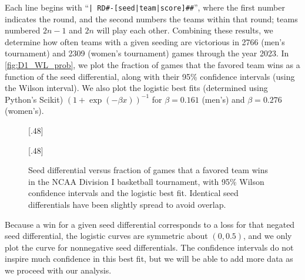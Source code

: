 \documentclass{article}
\begin{document}
Each line begins with ``\texttt{| RD\#-[seed|team|score]\#\#}'', where the first number indicates the round, and the second numbers the teams within that round; teams numbered $2n-1$ and $2n$ will play each other.  Combining these results, we determine how often teams with a given seeding are victorious in 2766 (men's tournament) and 2309 (women's tournament) games through the year 2023. %
%
In \autoref{fig:D1_WL_prob}, we plot the fraction of games that the favored team wins as a function of the seed differential, along with their 95\% confidence intervals (using the Wilson interval\cite{Brown}).  We also plot the logistic best fits (determined using Python's Scikit\cite{scikit-learn}) $(1+\exp(-\beta x))^{-1}$ for $\beta=0.161$ (men's) and $\beta=0.276$ (women's).
\begin{figure}
[.48\textwidth]{%
%
}\hfill
{}[.48\textwidth]{%
}
\caption{\label{fig:D1_WL_prob}Seed differential versus fraction of games that a favored team wins in the NCAA Division I basketball tournament, with 95\% Wilson confidence intervals and the logistic best fit.  Identical seed differentials have been slightly spread to avoid overlap.}
\end{figure}
Because a win for a given seed differential corresponds to a loss for that negated seed differential, the logistic curves are symmetric about $(0,0.5)$, and we only plot the curve for nonnegative seed differentials.  The confidence intervals do not inspire much confidence in this best fit, but we will be able to add more data as we proceed with our analysis.
\end{document}
